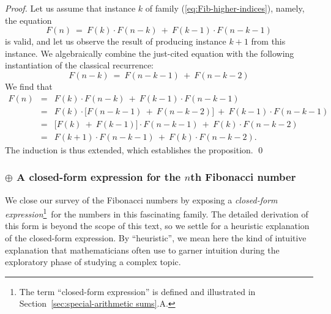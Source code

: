 \begin{proof}
Let us assume that instance $k$ of family
(\ref{eq:Fib-higher-indices}), namely, the equation
\[ F(n) \ = \ F(k) \cdot F(n-k) \ + \ F(k-1) \cdot F(n-k-1) \]
is valid, and let us observe the result of producing instance $k+1$
from this instance.  We algebraically combine the just-cited equation
with the following instantiation of the classical recurrence:
\[ F(n-k) \ = \ F(n-k-1) \ + \ F(n-k-2) \]
We find that
\begin{eqnarray*}
F(n) & = & F(k) \cdot F(n-k) \ + \ F(k-1) \cdot F(n-k-1) \\
     & = & F(k) \cdot \big[ F(n-k-1) \ + \ F(n-k-2) \big]  \ +
             \ F(k-1) \cdot F(n-k-1) \\
     & = & \big[ F(k) \ + \ F(k-1) \big] \cdot F(n-k-1) \ + \ F(k)
             \cdot F(n-k-2) \\
     & = & F(k+1) \cdot F(n-k-1) \ + \ F(k) \cdot F(n-k-2).
\end{eqnarray*}
The induction is thus extended, which establishes the proposition.
\qed 
\end{proof}

\subsubsection{$\oplus$  A closed-form expression for the $n$th Fibonacci number}
\label{sec:Fib-Golden-Ratio}

We close our survey of the Fibonacci numbers by exposing a {\it
  closed-form expression}\footnote{The term ``closed-form expression''
  is defined and illustrated in Section~\ref{sec:special-arithmetic
    sums}.A.}~for the numbers in this fascinating family.  The
detailed derivation of this form is beyond the scope of this text, so
we settle for a heuristic explanation of the closed-form expression.
By ``heuristic'', we mean here the kind of intuitive explanation that
mathematicians often use to garner intuition during the exploratory
phase of studying a complex topic. 


